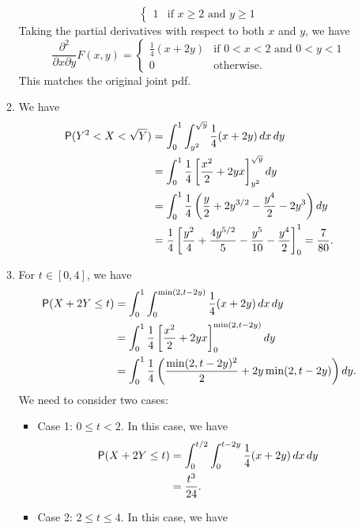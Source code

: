 \documentclass[12pt]{article}
\newcommand{\Prob}{{\sf P}}
\newenvironment{problem}[2][Problem]{\begin{trivlist}
\item[\hskip \labelsep {\bfseries #1}\hskip \labelsep {\bfseries #2.}]}
{\end{trivlist}}
\begin{document}
\begin{problem}{5}
\begin{itemize}
\begin{enumerate}
\[\begin{cases}
          1 & \text{if } x \ge 2 \text{ and } y \ge 1
        \end{cases}
      \]
      Taking the partial derivatives with respect to both $x$ and $y$, 
      we have
      \[
        \frac{\partial^2}{\partial x \partial y} F(x,y) = \begin{cases}
          \frac{1}{4} (x + 2y) & 
          \text{if } 0 < x < 2 \text{ and } 0 < y < 1 \\
          0 & \text{otherwise.}
        \end{cases}
      \]
      This matches the original joint pdf.
      \item We have
      \begin{align*}
        \Prob(Y^2 < X < \sqrt{Y}) &= 
        \int_0^1 \int_{y^2}^{\sqrt{y}} \frac{1}{4} (x + 2y) \, dx \, dy \\
        &= \int_0^1 \frac{1}{4} \left[ \frac{x^2}{2} + 2yx \right]_{y^2}^{\sqrt{y}} dy \\
        &= \int_0^1 \frac{1}{4} \left( 
        \frac{y}{2} + 2y^{3/2} - \frac{y^4}{2} - 2y^3 \right) dy \\
        &= \frac{1}{4} \left[ 
        \frac{y^2}{4} + \frac{4y^{5/2}}{5} - \frac{y^5}{10} - \frac{y^4}{2} 
        \right]_{0}^{1} = \frac{7}{80}.
      \end{align*}
      \item For $t \in [0,4]$, we have
      \begin{align*}
        \Prob(X + 2Y \le t) &= \int_0^1 \int_0^{\min(2, t - 2y)} \frac{1}{4} (x + 2y) \, dx \, dy \\
        &= \int_0^1 \frac{1}{4} \left[ \frac{x^2}{2} + 2yx \right]_{0}^{\min(2, t - 2y)} dy \\
        &= \int_0^1 \frac{1}{4} \left( 
        \frac{\min(2, t - 2y)^2}{2} + 2y\min(2, t - 2y) \right) dy.
      \end{align*}
      We need to consider two cases:
      \begin{itemize}
        \item Case 1: $0 \le t < 2$. In this case, we have
        \begin{align*}
          \Prob(X + 2Y \le t) &= \int_0^{t/2} 
          \int_0^{t - 2y} \frac{1}{4} (x + 2y) \, dx \, dy \\
          &= \frac{t^3}{24}.
        \end{align*}
        \item Case 2: $2 \le t \le 4$. In this case, we have
        \begin{align*}

\end{align*}
\end{itemize}
\end{enumerate}
\end{itemize}
\end{problem}
\end{document}
